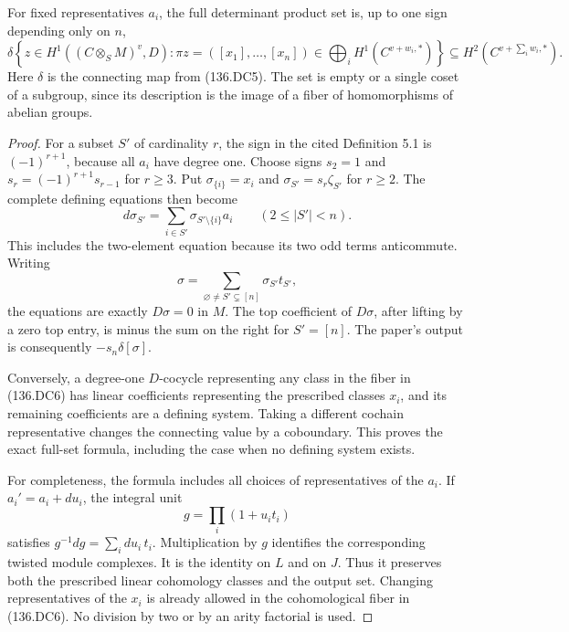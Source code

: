 For fixed representatives \(a_i\), the full determinant product set is,
up to one sign depending only on \(n\),
\[
 \delta\left\{z\in H^1((C\otimes_SM)^v,D):
          \pi z=([x_1],\ldots,[x_n])\in
                  \bigoplus_iH^1(C^{v+w_i,*})\right\}
   \subseteq H^2(C^{v+\sum_iw_i,*}).                 \tag{136.DC6}
\]
Here \(\delta\) is the connecting map from (136.DC5).
The set is empty or a single coset of a subgroup, since its description
is the image of a fiber of homomorphisms of abelian groups.

\begin{proof}
For a subset \(S'\) of cardinality \(r\), the sign in the cited
Definition 5.1 is \((-1)^{r+1}\), because all \(a_i\) have degree one.
Choose signs \(s_2=1\) and
\(s_r=(-1)^{r+1}s_{r-1}\) for \(r\geq3\).
Put \(\sigma_{\{i\}}=x_i\) and
\(\sigma_{S'}=s_r\zeta_{S'}\) for \(r\geq2\).
The complete defining equations then become
\[
             d\sigma_{S'}=
                   \sum_{i\in S'}\sigma_{S'\setminus\{i\}}a_i
                    \qquad(2\leq|S'|<n).
\]
This includes the two-element equation because its two odd terms
anticommute. Writing
\[
       \sigma=\sum_{\varnothing\neq S'\subsetneq[n]}
                         \sigma_{S'}t_{S'},
\]
the equations are exactly \(D\sigma=0\) in \(M\).
The top coefficient of \(D\sigma\), after lifting by a zero top entry,
is minus the sum on the right for \(S'=[n]\).
The paper's output is consequently \(-s_n\delta[\sigma]\).

Conversely, a degree-one \(D\)-cocycle representing any class in the
fiber in (136.DC6) has linear coefficients representing the prescribed
classes \(x_i\), and its remaining coefficients are a defining system.
Taking a different cochain representative changes the connecting value
by a coboundary. This proves the exact full-set formula, including the
case when no defining system exists.

For completeness, the formula includes all choices of representatives
of the \(a_i\). If \(a_i'=a_i+du_i\), the integral unit
\[
                         g=\prod_i(1+u_it_i)
\]
satisfies \(g^{-1}dg=\sum_i du_i\,t_i\).
Multiplication by \(g\) identifies the corresponding twisted module
complexes. It is the identity on \(L\) and on \(J\).
Thus it preserves both the prescribed linear cohomology classes and
the output set. Changing representatives of the \(x_i\) is already
allowed in the cohomological fiber in (136.DC6).
No division by two or by an arity factorial is used.
\end{proof}


